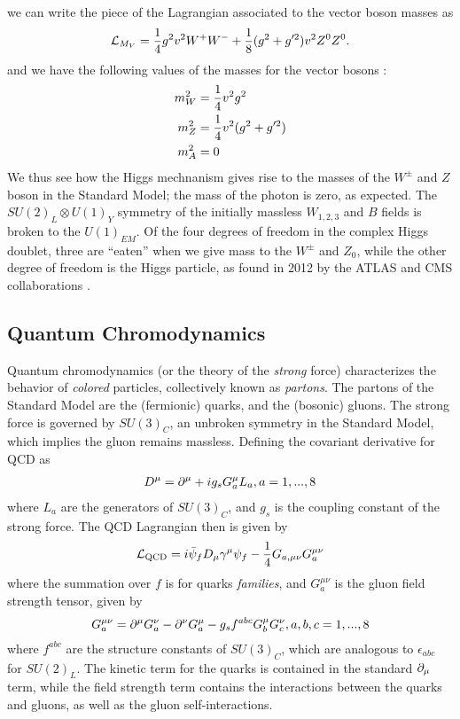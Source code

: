 we can write the piece of the Lagrangian associated to the vector boson masses as
\begin{equation}
\mathcal{L}_{M_V} = \frac{1}{4} g^2 v^2 W^+ W^- + \frac{1}{8} (g^2 + g'^2)v^2 Z^0 Z^0 .
\end{equation}
and we have the following values of the masses for the vector bosons :
\begin{align}
m_W^2 &= \frac{1}{4}  v^2 g^2  \\
m_Z^2 &= \frac{1}{4}  v^2 (g^2 + g'^2)  \notag \\
m_A^2 &= 0  \notag
\end{align}
We thus see how the Higgs mechnanism gives rise to the masses of the $W^{\pm}$ and $Z$ boson in the Standard Model; the mass of the photon is zero, as expected.
The $SU(2)_L \otimes U(1)_Y$ symmetry of the initially massless $W_{1,2,3}$ and $B$ fields is broken to the $U(1)_{EM}$.
Of the four degrees of freedom in the complex Higgs doublet, three are ``eaten'' when we give mass to the $W^\pm$ and $Z_0$, while the other degree of freedom is the Higgs particle, as found in 2012 by the ATLAS and CMS collaborations \cite{HIGG-2012-27, CMS-HIG-12-028}.

\subsection{Quantum Chromodynamics}

Quantum chromodynamics (or the theory of the \textit{strong} force) characterizes the behavior of \textit{colored} particles, collectively known as \textit{partons}.
The partons of the Standard Model are the (fermionic) quarks, and the (bosonic) gluons.
The strong force is governed by $SU(3)_C$, an unbroken symmetry in the Standard Model, which implies the gluon remains massless.
Defining the covariant derivative for QCD as
\begin{align}
D^\mu = \partial^\mu + ig_s G^\mu_a L_a, a = 1,...,8
\end{align}
where $L_a$ are the generators of $SU(3)_C$, and $g_s$ is the coupling constant of the strong force.
The QCD Lagrangian then is given by
\begin{equation}
\mathcal{L}_{\text{QCD}} = i \bar{\psi}_f D_\mu \gamma^\mu \psi_f - \frac{1}{4} G_{a,\mu\nu} G_a^{\mu\nu}
\end{equation}
where the summation over $f$ is for quarks \textit{families}, and $ G_a^{\mu\nu}$ is the gluon field strength tensor, given by
\begin{equation}
G^{\mu\nu}_a = \partial^\mu G^\nu_a - \partial^\nu G^\mu_a - g_s f^{abc} G^\mu_b G^\nu_c, a,b,c = 1,...,8
\end{equation}
where $f^{abc}$ are the structure constants of $SU(3)_C$, which are analogous to $\epsilon_{abc}$ for $SU(2)_L$.
The kinetic term for the quarks is contained in the standard $\partial_\mu$ term, while the field strength term contains the interactions between the quarks and gluons, as well as the gluon self-interactions.

